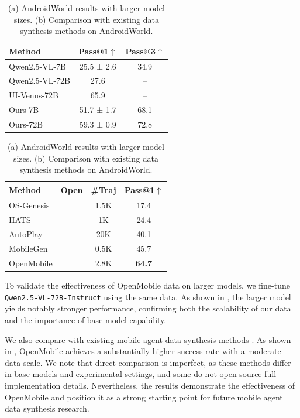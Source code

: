 \documentclass{article} %
\newcommand{\cmark}{\textcolor[HTML]{2E8B57}{\ding{51}}}
\newcommand{\xmark}{\textcolor[HTML]{C0392B}{\ding{55}}}
\begin{document}
\begin{table}[ht]
\centering
\small
\setlength{\tabcolsep}{4pt}
\renewcommand{\arraystretch}{1.05}
\begin{minipage}[t]{0.48\textwidth}
\centering
\begin{tabular}{lcc}
\toprule
\textbf{Method} & \textbf{Pass@1$\uparrow$} & \textbf{Pass@3$\uparrow$} \\
\midrule
Qwen2.5-VL-7B & 25.5 ± 2.6 & 34.9 \\
Qwen2.5-VL-72B & 27.6 & -- \\
UI-Venus-72B & 65.9 & -- \\
\midrule
Ours-7B & 51.7 ± 1.7 & 68.1 \\
Ours-72B & 59.3 ± 0.9 & 72.8 \\
\bottomrule
\end{tabular}
\label{tab:appendix_scaling}
\end{minipage}
\hfill
\begin{minipage}[t]{0.48\textwidth}
\centering
\begin{tabular}{lccc}
\toprule
\textbf{Method} & \textbf{Open} & \textbf{\#Traj} & \textbf{Pass@1$\uparrow$} \\
\midrule
OS-Genesis & \cmark & 1.5K & 17.4 \\
HATS & \cmark & 1K & 24.4 \\
AutoPlay & \xmark & 20K & 40.1 \\
MobileGen & \xmark & 0.5K & 45.7 \\
OpenMobile & \cmark & 2.8K & \textbf{64.7} \\
\bottomrule
\end{tabular}
\label{tab:appendix_comparison}
\end{minipage}
\caption{(a) AndroidWorld results with larger model sizes. (b) Comparison with existing data synthesis methods on AndroidWorld.}
\label{tab:appendix_additional}
\end{table}

To validate the effectiveness of OpenMobile data on larger models, we fine-tune \texttt{Qwen2.5-VL-72B-Instruct} using the same data. As shown in , the larger model yields notably stronger performance, confirming both the scalability of our data and the importance of base model capability.

We also compare with existing mobile agent data synthesis methods \citep{sun2025genesis, shao2026hats, ramrakhya2025scaling, kang2026learning}.
As shown in , OpenMobile achieves a substantially higher success rate with a moderate data scale.
We note that direct comparison is imperfect, as these methods differ in base models and experimental settings, and some do not open-source full implementation details.
Nevertheless, the results demonstrate the effectiveness of OpenMobile and position it as a strong starting point for future mobile agent data synthesis research.
\end{document}
